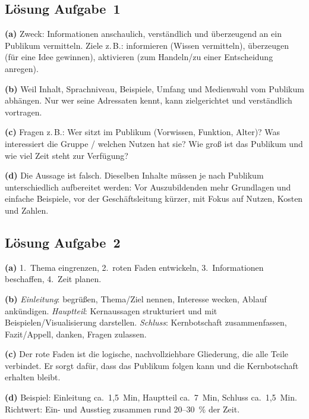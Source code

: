 \documentclass[11pt, a4paper]{article}
\begin{document}
\subsection*{Lösung Aufgabe~1}
\begin{loesung}
\textbf{(a)} Zweck: Informationen anschaulich, verständlich und überzeugend an ein
Publikum vermitteln. Ziele z.\,B.: informieren (Wissen vermitteln), überzeugen (für eine
Idee gewinnen), aktivieren (zum Handeln/zu einer Entscheidung anregen).

\textbf{(b)} Weil Inhalt, Sprachniveau, Beispiele, Umfang und Medienwahl vom Publikum
abhängen. Nur wer seine Adressaten kennt, kann zielgerichtet und verständlich vortragen.

\textbf{(c)} Fragen z.\,B.: Wer sitzt im Publikum (Vorwissen, Funktion, Alter)? Was
interessiert die Gruppe / welchen Nutzen hat sie? Wie groß ist das Publikum und wie viel
Zeit steht zur Verfügung?

\textbf{(d)} Die Aussage ist falsch. Dieselben Inhalte müssen je nach Publikum
unterschiedlich aufbereitet werden: Vor Auszubildenden mehr Grundlagen und einfache
Beispiele, vor der Geschäftsleitung kürzer, mit Fokus auf Nutzen, Kosten und Zahlen.
\end{loesung}

\subsection*{Lösung Aufgabe~2}
\begin{loesung}
\textbf{(a)} 1.~Thema eingrenzen, 2.~roten Faden entwickeln, 3.~Informationen beschaffen,
4.~Zeit planen.

\textbf{(b)} \emph{Einleitung}: begrüßen, Thema/Ziel nennen, Interesse wecken, Ablauf
ankündigen. \emph{Hauptteil}: Kernaussagen strukturiert und mit Beispielen/Visualisierung
darstellen. \emph{Schluss}: Kernbotschaft zusammenfassen, Fazit/Appell, danken, Fragen
zulassen.

\textbf{(c)} Der rote Faden ist die logische, nachvollziehbare Gliederung, die alle Teile
verbindet. Er sorgt dafür, dass das Publikum folgen kann und die Kernbotschaft erhalten
bleibt.

\textbf{(d)} Beispiel: Einleitung ca.\ 1,5~Min, Hauptteil ca.\ 7~Min, Schluss ca.\ 1,5~Min.
Richtwert: Ein- und Ausstieg zusammen rund 20--30~\% der Zeit.
\end{loesung}
\end{document}
